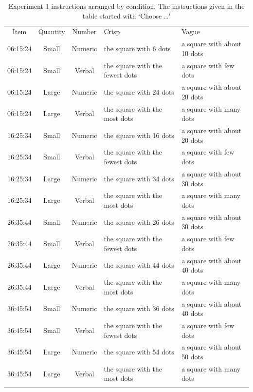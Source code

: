 \documentclass[ %
  graybox       %
 ,envcountchap  %
 ,sectrefs      %
]{svmono}
\begin{document}
\begin{table}[htbp]
\centering
\caption{Experiment 1 instructions arranged by condition. The instructions given in the table started with `Choose \ldots'}
\label{instructionsC-exp-1}
\begin{tabular}{cccll}
\hline\noalign{\smallskip}
Item & Quantity & Number & Crisp & Vague\\
\noalign{\smallskip}\hline\noalign{\smallskip}
06:15:24 & Small & Numeric & the square with 6 dots & a square with about 10 dots\\
06:15:24 & Small & Verbal & the square with the fewest dots & a square with few dots\\
06:15:24 & Large & Numeric & the square with 24 dots & a square with about 20 dots\\
06:15:24 & Large & Verbal & the square with the most dots & a square with many dots\\
\noalign{\smallskip}\hline\noalign{\smallskip}
16:25:34 & Small & Numeric & the square with 16 dots & a square with about 20 dots\\
16:25:34 & Small & Verbal & the square with the fewest dots & a square with few dots\\
16:25:34 & Large & Numeric & the square with 34 dots & a square with about 30 dots\\
16:25:34 & Large & Verbal & the square with the most dots & a square with many dots\\
\noalign{\smallskip}\hline\noalign{\smallskip}
26:35:44 & Small & Numeric & the square with 26 dots & a square with about 30 dots\\
26:35:44 & Small & Verbal & the square with the fewest dots & a square with few dots\\
26:35:44 & Large & Numeric & the square with 44 dots & a square with about 40 dots\\
26:35:44 & Large & Verbal & the square with the most dots & a square with many dots\\
\noalign{\smallskip}\hline\noalign{\smallskip}
36:45:54 & Small & Numeric & the square with 36 dots & a square with about 40 dots\\
36:45:54 & Small & Verbal & the square with the fewest dots & a square with few dots\\
36:45:54 & Large & Numeric & the square with 54 dots & a square with about 50 dots\\
36:45:54 & Large & Verbal & the square with the most dots & a square with many dots\\
\noalign{\smallskip}\hline
\end{tabular}
\end{table}
\end{document}
